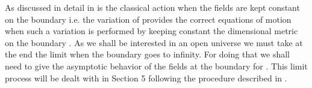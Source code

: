 \documentclass[a4paper,12pt]{article}
\begin{document}
As discussed in detail in \cite{hawkinghunter,hayward} 
\coordHE{} is the classical action when the fields are kept constant on the
boundary \coordHE{} i.e. the variation of \coordHE{} provides the correct
equations of motion when such a variation is performed by keeping
constant the \coordHE{} dimensional metric \coordHE{} on the boundary
\coordHE{}. As we shall be interested in an open universe we must 
take at the end the limit when the boundary \coordHE{} goes to
infinity. For doing that we shall need to give the asymptotic
behavior of the fields at the boundary \coordHE{} for \coordHE{}. This limit process  will be dealt with in Section 5
following the procedure described in \cite{hawkinghunter}.
\end{document}
